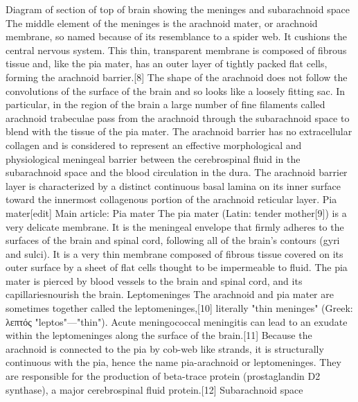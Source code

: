 Diagram of section of top of brain showing the meninges and subarachnoid space
The middle element of the meninges is the arachnoid mater, or arachnoid membrane, so named because of its resemblance to a spider web. It cushions the central nervous system. This thin, transparent membrane is composed of fibrous tissue and, like the pia mater, has an outer layer of tightly packed flat cells, forming the arachnoid barrier.[8]
The shape of the arachnoid does not follow the convolutions of the surface of the brain and so looks like a loosely fitting sac. In particular, in the region of the brain a large number of fine filaments called arachnoid trabeculae pass from the arachnoid through the subarachnoid space to blend with the tissue of the pia mater. The arachnoid barrier has no extracellular collagen and is considered to represent an effective morphological and physiological meningeal barrier between the cerebrospinal fluid in the subarachnoid space and the blood circulation in the dura.
The arachnoid barrier layer is characterized by a distinct continuous basal lamina on its inner surface toward the innermost collagenous portion of the arachnoid reticular layer.
Pia mater[edit]
Main article: Pia mater
The pia mater (Latin: tender mother[9]) is a very delicate membrane. It is the meningeal envelope that firmly adheres to the surfaces of the brain and spinal cord, following all of the brain's contours (gyri and sulci). It is a very thin membrane composed of fibrous tissue covered on its outer surface by a sheet of flat cells thought to be impermeable to fluid. The pia mater is pierced by blood vessels to the brain and spinal cord, and its capillariesnourish the brain.
Leptomeninges
The arachnoid and pia mater are sometimes together called the leptomeninges,[10] literally "thin meninges" (Greek: λεπτός "leptos"—"thin"). Acute meningococcal meningitis can lead to an exudate within the leptomeninges along the surface of the brain.[11] Because the arachnoid is connected to the pia by cob-web like strands, it is structurally continuous with the pia, hence the name pia-arachnoid or leptomeninges. They are responsible for the production of beta-trace protein (prostaglandin D2 synthase), a major cerebrospinal fluid protein.[12]
Subarachnoid space
 

